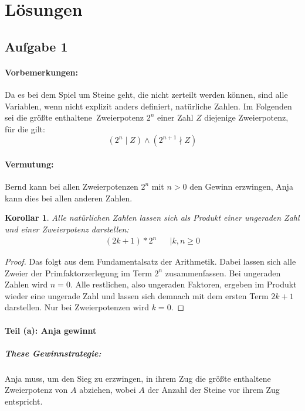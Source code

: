 \documentclass[12pt]{article}
\numberwithin{equation}{subsection}
\newtheorem{korollar}{Korollar}
\begin{document}
\section{Lösungen}
\subsection{Aufgabe 1}

\paragraph{Vorbemerkungen:} Da es bei dem Spiel um Steine geht, die nicht zerteilt werden können, sind alle Variablen, wenn nicht explizit anders definiert, natürliche Zahlen. Im Folgenden sei die \glqq größte enthaltene\grqq\ Zweierpotenz $2^n$ einer Zahl $Z$ diejenige Zweierpotenz, für die gilt: 
\[\left(2^n\mid Z\right)\land\left(2^{n+1}\nmid Z\right)\]


\paragraph{Vermutung:} Bernd kann bei allen Zweierpotenzen $2^n$ mit $n>0$ den Gewinn erzwingen, Anja kann dies bei allen anderen Zahlen.

\begin{korollar}
\label{ug2n}
Alle natürlichen Zahlen lassen sich als Produkt einer ungeraden Zahl und einer Zweierpotenz darstellen:
\begin{align*}
	(2k+1)*2^n &&\left| k,n \ge 0 \right.
\end{align*}
\end{korollar}

\begin{proof} Das folgt aus dem Fundamentalsatz der Arithmetik. Dabei lassen sich alle Zweier der Primfaktorzerlegung im Term $2^n$ zusammenfassen. Bei ungeraden Zahlen wird $n=0$. Alle restlichen, also ungeraden Faktoren, ergeben im Produkt wieder eine ungerade Zahl und lassen sich demnach mit dem ersten Term $2k+1$ darstellen. Nur bei Zweierpotenzen wird $k=0$.
\end{proof}
\paragraph{Teil (a): Anja gewinnt}
\subparagraph{These Gewinnstrategie:}
Anja muss, um den Sieg zu erzwingen, in ihrem Zug die größte enthaltene Zweierpotenz von $A$ abziehen, wobei $A$ der Anzahl der Steine vor ihrem Zug entspricht.
\end{document}
